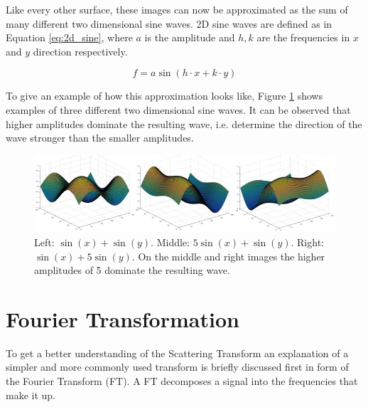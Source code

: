 

Like every other surface, these images can now be approximated as the sum of many different two dimensional sine waves. 2D sine waves are defined as in Equation \ref{eq:2d_sine}, where $a$ is the amplitude and $h, k$ are the frequencies in $x$ and $y$ direction respectively.

\begin{equation}
	f = a \sin(h\cdot x+k\cdot y)
	\label{eq:2d_sine}
\end{equation}

To give an example of how this approximation looks like, Figure \ref{fig:2d_sine} shows examples of three different two dimensional sine waves. It can be observed that higher amplitudes dominate the resulting wave, i.e. determine the direction of the wave stronger than the smaller amplitudes. 


\begin{figure}[!htb]
	\centering
	\includegraphics[width = \textwidth]{images/2d_sine.jpg}
	\caption{Left: $\sin(x) +\sin(y)$. Middle:  $5 \sin(x)+ \sin(y)$. Right: $	\sin(x)+5\sin(y)$. On the middle and right images the higher amplitudes of 5 dominate the resulting wave. \protect\footnotemark}
	\label{fig:2d_sine}
\end{figure}


\section{Fourier Transformation}
\label{sec:fourier_transform}

To get a better understanding of the Scattering Transform an explanation of a simpler and more commonly used transform is briefly discussed first in form of the Fourier Transform (FT). A FT decomposes a signal into the frequencies that make it up.

